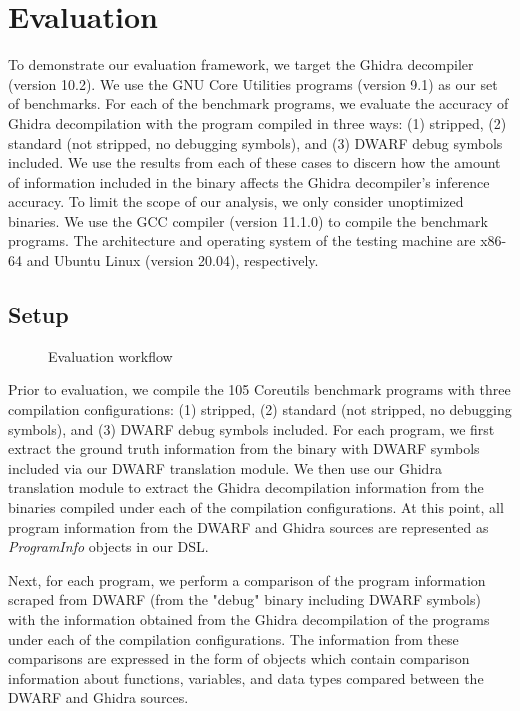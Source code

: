 \chapter{Evaluation} \label{sec:evaluation}

To demonstrate our evaluation framework, we target the Ghidra decompiler (version 10.2). We use the GNU Core Utilities programs (version 9.1) as our set of benchmarks. For each of the benchmark programs, we evaluate the accuracy of Ghidra decompilation with the program compiled in three ways: (1) stripped, (2) standard (not stripped, no debugging symbols), and (3) DWARF debug symbols included. We use the results from each of these cases to discern how the amount of information included in the binary affects the Ghidra decompiler's inference accuracy. To limit the scope of our analysis, we only consider unoptimized binaries. We use the GCC compiler (version 11.1.0) to compile the benchmark programs. The architecture and operating system of the testing machine are x86-64 and Ubuntu Linux (version 20.04), respectively.

\section{Setup}

\begin{figure}
    \centering
    \scalebox{0.5}{
        
    }
    \caption{Evaluation workflow}
    \label{fig:evaluation-process}
\end{figure}

Prior to evaluation, we compile the 105 Coreutils benchmark programs with three compilation configurations: (1) stripped, (2) standard (not stripped, no debugging symbols), and (3) DWARF debug symbols included. For each program, we first extract the ground truth information from the binary with DWARF symbols included via our DWARF translation module. We then use our Ghidra translation module to extract the Ghidra decompilation information from the binaries compiled under each of the compilation configurations. At this point, all program information from the DWARF and Ghidra sources are represented as \emph{ProgramInfo} objects in our DSL.

Next, for each program, we perform a comparison of the program information scraped from DWARF (from the "debug" binary including DWARF symbols) with the information obtained from the Ghidra decompilation of the programs under each of the compilation configurations. The information from these comparisons are expressed in the form of objects which contain comparison information about functions, variables, and data types compared between the DWARF and Ghidra sources.

